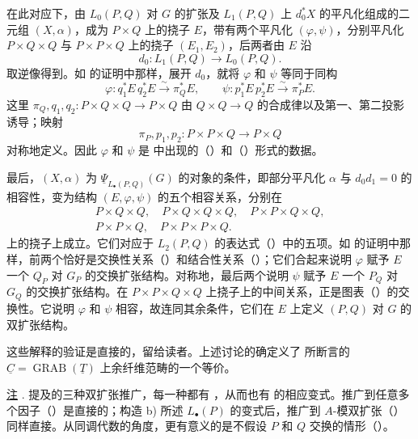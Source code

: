 在此对应下，由 $L_0(P,Q)$ 对 $G$ 的扩张及 $L_1(P,Q)$ 上 $d_0^*X$ 的平凡化组成的二元组 $(X,\alpha)$，成为 $P\times Q$ 上的挠子 $E$，带有两个平凡化 $(\varphi,\psi)$，分别平凡化 $P\times Q\times Q$ 与 $P\times P\times Q$ 上的挠子 $(E_1,E_2)$，后两者由 $E$ 沿
\[
 d_0:L_1(P,Q)\longrightarrow L_0(P,Q).
\]
取逆像得到。如  的证明中那样，展开 $d_0$，就将 $\varphi$ 和 $\psi$ 等同于同构
\[
 \varphi:q_1^*E\,q_2^*E\xrightarrow{\sim}\pi_Q^*E,
 \qquad
 \psi:p_1^*E\,p_2^*E\xrightarrow{\sim}\pi_P^*E.
\]
这里 $\pi_Q,q_1,q_2:P\times Q\times Q\longrightarrow P\times Q$ 由 $Q\times Q\longrightarrow Q$ 的合成律以及第一、第二投影诱导；映射
\[
 \pi_P,p_1,p_2:P\times P\times Q\longrightarrow P\times Q
\]
对称地定义。因此 $\varphi$ 和 $\psi$ 是  中出现的（）和（）形式的数据。

最后，$(X,\alpha)$ 为 $\underline\Psi_{L_\bullet(P,Q)}(G)$ 的对象的条件，即部分平凡化 $\alpha$ 与 $d_0d_1=0$ 的相容性，变为结构 $(E,\varphi,\psi)$ 的五个相容关系，分别在
\[
\begin{gathered}
 P\times Q\times Q,\quad
 P\times Q\times Q\times Q,\quad
 P\times P\times Q\times Q,\\
 P\times P\times Q,\quad
 P\times P\times P\times Q.
\end{gathered}
\]
上的挠子上成立。它们对应于 $L_2(P,Q)$ 的表达式（）中的五项。如  的证明中那样，前两个恰好是交换性关系（）和结合性关系（）；它们合起来说明 $\varphi$ 赋予 $E$ 一个 $Q_P$ 对 $G_P$ 的交换扩张结构。对称地，最后两个说明 $\psi$ 赋予 $E$ 一个 $P_Q$ 对 $G_Q$ 的交换扩张结构。在 $P\times P\times Q\times Q$ 上挠子上的中间关系，正是图表（）的交换性。它说明 $\varphi$ 和 $\psi$ 相容，故连同其余条件，它们在 $E$ 上定义 $(P,Q)$ 对 $G$ 的双扩张结构。

这些解释的验证是直接的，留给读者。上述讨论的确定义了  所断言的 $\underline C=\operatorname{GRAB}(\underline T)$ 上余纤维范畴的一个等价。

\underline{注} .  提及的三种双扩张推广，每一种都有 ，从而也有  的相应变式。推广到任意多个因子（）是直接的；构造  b) 所述 $L_\bullet(P)$ 的变式后，推广到 $A$-模双扩张（）同样直接。从同调代数的角度，更有意义的是不假设 $P$ 和 $Q$ 交换的情形（）。

